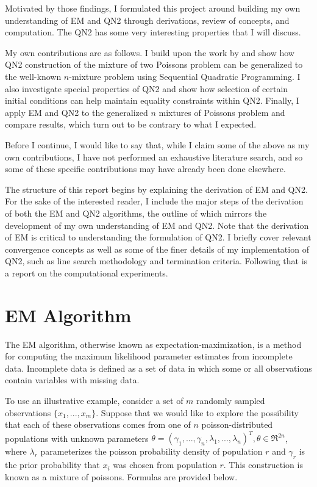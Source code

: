 \documentclass[letter,12pt]{article}
\begin{document}
Motivated by those findings, I formulated this project around building my own understanding of EM and QN2 through derivations, review of concepts, and computation.  The QN2 has some very interesting properties that I will discuss.

My own contributions are as follows.  I build upon the work by \cite{jamshidianj97} and show how QN2 construction of the mixture of two Poissons problem can be generalized to the well-known $n$-mixture problem using Sequential Quadratic Programming.  I also investigate special properties of QN2 and show how selection of certain initial conditions can help maintain equality constraints within QN2.  Finally, I apply EM and QN2 to the generalized $n$ mixtures of Poissons problem and compare results, which turn out to be contrary to what I expected. 

Before I continue, I would like to say that, while I claim some of the above as my own contributions, I have not performed an exhaustive literature search, and so some of these specific contributions may have already been done elsewhere.  

The structure of this report begins by explaining the derivation of EM and QN2.  For the sake of the interested reader, I include the major steps of the derivation of both the EM and QN2 algorithms, the outline of which mirrors the development of my own understanding of EM and QN2.  Note that the derivation of EM is critical to understanding the formulation of QN2.  I briefly cover relevant convergence concepts as well as some of the finer details of my implementation of QN2, such as line search methodology and termination criteria.  Following that is a report on the computational experiments.

\section{EM Algorithm}

The EM algorithm, otherwise known as expectation-maximization, is a method for computing the maximum likelihood parameter estimates from incomplete data.  Incomplete data is defined as a set of data in which some or all observations contain variables with missing data.  

To use an illustrative example, consider a set of $m$ randomly sampled observations $\{x_1,...,x_m\}$.  Suppose that we would like to explore the possibility that each of these observations comes from one of $n$ poisson-distributed populations with unknown parameters $\theta=(\gamma_1,...,\gamma_n,\lambda_1,...,\lambda_n)^T, \theta \in \Re^{2n}$, where $\lambda_r$ parameterizes the poisson probability density of population $r$ and $\gamma_r$ is the prior probability that $x_i$ was chosen from population $r$.  This construction is known as a mixture of poissons.  Formulas are provided below.
\end{document}
